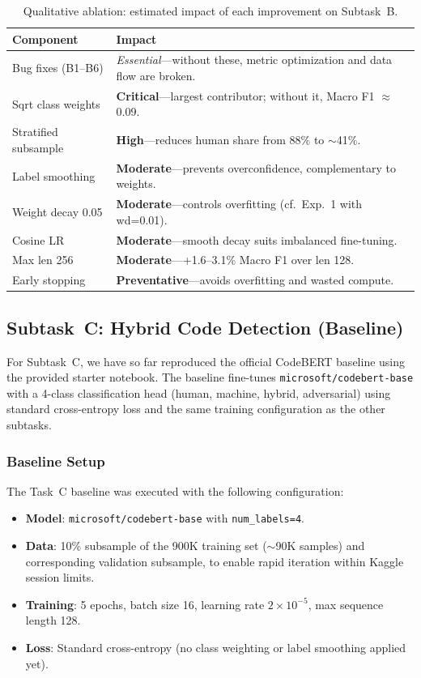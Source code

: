 \documentclass[11pt]{article}
\begin{document}
\begin{table}[htbp]
\centering
\footnotesize
\begin{tabularx}{\columnwidth}{@{}l X@{}}
\toprule
\textbf{Component} & \textbf{Impact} \\ \midrule
Bug fixes (B1--B6) & \textit{Essential}---without these, metric optimization and data flow are broken. \\
Sqrt class weights & \textbf{Critical}---largest contributor; without it, Macro F1 $\approx$ 0.09. \\
Stratified subsample & \textbf{High}---reduces human share from 88\% to $\sim$41\%. \\
Label smoothing & \textbf{Moderate}---prevents overconfidence, complementary to weights. \\
Weight decay 0.05 & \textbf{Moderate}---controls overfitting (cf.\ Exp.~1 with wd=0.01). \\
Cosine LR & \textbf{Moderate}---smooth decay suits imbalanced fine-tuning. \\
Max len 256 & \textbf{Moderate}---+1.6--3.1\% Macro F1 over len 128. \\
Early stopping & \textbf{Preventative}---avoids overfitting and wasted compute. \\
\bottomrule
\end{tabularx}
\caption{Qualitative ablation: estimated impact of each improvement on Subtask~B.}
\label{tab:ablation}
\end{table}

\subsection{Subtask~C: Hybrid Code Detection (Baseline)}
\label{sec:taskC_results}

For Subtask~C, we have so far reproduced the official CodeBERT baseline using the provided starter notebook. The baseline fine-tunes \texttt{microsoft/codebert-base} with a 4-class classification head (human, machine, hybrid, adversarial) using standard cross-entropy loss and the same training configuration as the other subtasks.

\subsubsection{Baseline Setup}

The Task~C baseline was executed with the following configuration:
\begin{itemize}
    \item \textbf{Model}: \texttt{microsoft/codebert-base} with \texttt{num\_labels=4}.
    \item \textbf{Data}: 10\% subsample of the 900K training set ($\sim$90K samples) and corresponding validation subsample, to enable rapid iteration within Kaggle session limits.
    \item \textbf{Training}: 5 epochs, batch size 16, learning rate $2{\times}10^{-5}$, max sequence length 128.
    \item \textbf{Loss}: Standard cross-entropy (no class weighting or label smoothing applied yet).
\end{itemize}
\end{document}
